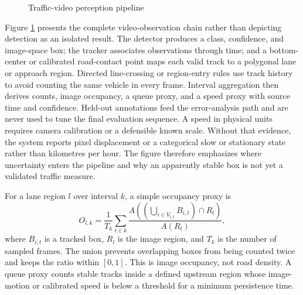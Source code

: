 \begin{figure}[htbp]
\centering
{}
\caption{Traffic-video perception pipeline}
\label{fig:perception}
\end{figure}

Figure \ref{fig:perception} presents the complete video-observation chain rather than depicting detection as an isolated result. The detector produces a class, confidence, and image-space box; the tracker associates observations through time; and a bottom-center or calibrated road-contact point maps each valid track to a polygonal lane or approach region. Directed line-crossing or region-entry rules use track history to avoid counting the same vehicle in every frame. Interval aggregation then derives counts, image occupancy, a queue proxy, and a speed proxy with source time and confidence. Held-out annotations feed the error-analysis path and are never used to tune the final evaluation sequence. A speed in physical units requires camera calibration or a defensible known scale. Without that evidence, the system reports pixel displacement or a categorical slow or stationary state rather than kilometres per hour. The figure therefore emphasizes where uncertainty enters the pipeline and why an apparently stable box is not yet a validated traffic measure.

For a lane region $l$ over interval $k$, a simple occupancy proxy is
\begin{equation}
O_{l,k}=\frac{1}{T_k}\sum_{t\in k}\frac{A\!\left(\left(\bigcup_{i\in V_{l,t}}B_{i,t}\right)\cap R_l\right)}{A(R_l)},
\label{eq:occupancy}
\end{equation}
where $B_{i,t}$ is a tracked box, $R_l$ is the image region, and $T_k$ is the number of sampled frames. The union prevents overlapping boxes from being counted twice and keeps the ratio within $[0,1]$. This is image occupancy, not road density. A queue proxy counts stable tracks inside a defined upstream region whose image-motion or calibrated speed is below a threshold for a minimum persistence time.

